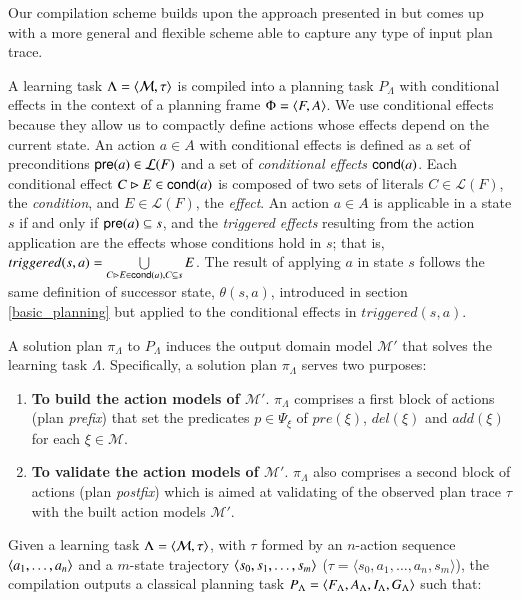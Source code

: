 Our compilation scheme builds upon the approach presented in \cite{aineto2018learning} but \FAMA comes up with a more general and flexible scheme able to capture any type of input plan trace.

\vspace{0.1cm}

A learning task $\Lambda={\langle \mathcal{M},\tau \rangle}$ is compiled into a planning task $P_{\Lambda}$ with conditional effects in the context of a planning frame $\Phi={\langle F,A \rangle}$. We use conditional effects because they allow us to compactly define actions whose effects depend on the current state. An action $a\in A$ with conditional effects is defined as a set of preconditions $\mathsf{pre}(a)\in\mathcal{L}(F)$ and a set of {\em conditional effects} $\mathsf{cond}(a)$. Each conditional effect $C\rhd E\in\mathsf{cond}(a)$ is composed of two sets of literals $C\in\mathcal{L}(F)$, the {\em condition}, and $E\in\mathcal{L}(F)$, the {\em effect}. An action $a\in A$ is applicable in a state $s$ if and only if $\mathsf{pre}(a)\subseteq s$, and the {\em triggered effects} resulting from the action application are the effects whose conditions hold in $s$; that is, $triggered(s,a)=\bigcup\limits_{C\rhd E\in\mathsf{cond}(a),C\subseteq s} E$. The result of applying $a$ in state $s$ follows the same definition of successor state, $\theta(s,a)$, introduced in section \ref{basic_planning} but applied to the conditional effects in $triggered(s,a)$.


\vspace{0.25cm}

A solution plan $\pi_\Lambda$ to $P_{\Lambda}$ induces the output domain model $\mathcal{M}'$ that solves the learning task $\Lambda$. Specifically, a solution plan $\pi_\Lambda$ serves two purposes:

\begin{enumerate}
\item {\bf To build the action models of $\mathcal{M}'$}. $\pi_\Lambda$ comprises a first block of actions (plan {\em prefix}) that set the predicates $p\in \Psi_{\xi}$ of $pre(\xi)$, $del(\xi)$ and $add(\xi)$ for each $\xi\in\mathcal{M}$.
\item {\bf To validate the action models of $\mathcal{M}'$}. $\pi_\Lambda$ also comprises a second block of actions (plan {\em postfix}) which is aimed at validating of the observed plan trace $\tau$ with the built action models $\mathcal{M}'$.
\end{enumerate}

Given a learning task $\Lambda={\langle \mathcal{M},\tau \rangle}$, with $\tau$ formed by an $n$-action sequence ${\langle a_1, \ldots, a_n \rangle}$ and a $m$-state trajectory ${\langle s_0, s_1, \ldots, s_m \rangle}$ ($\tau = \langle s_0, a_1, \ldots, a_n, s_m \rangle$), the compilation outputs a classical planning task $P_{\Lambda}={\langle F_{\Lambda},A_{\Lambda},I_{\Lambda},G_{\Lambda} \rangle}$ such that:

